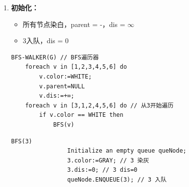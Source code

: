 \documentclass{article}
\begin{document}
\begin{enumerate}
    \item \textbf{初始化：}
    \begin{itemize}
        \item 所有节点染白，parent = -，dis = $\infty$
        \item 3入队，dis = 0
    \end{itemize}

\begin{lstlisting}[style=algorithmPPT]
    BFS-WALKER(G) // BFS遍历器
    foreach v in [1,2,3,4,5,6] do
        v.color:=WHITE; 
        v.parent=NULL 
        v.dis:=+∞;
    foreach v in [3,1,2,4,5,6] do // 从3开始遍历
        if v.color == WHITE then
            BFS(v)
        \end{lstlisting}

\begin{lstlisting}[style=algorithmPPT]
            BFS(3)
                Initialize an empty queue queNode;
                3.color:=GRAY; // 3 染灰
                3.dis:=0; // 3 dis=0
                queNode.ENQUEUE(3); // 3 入队
        \end{lstlisting}

    \begin{figure}[htbp]
        \begin{minipage}[b]{0.6\textwidth}    %
            \centering
\end{minipage}
\end{figure}
\end{enumerate}
\end{document}
